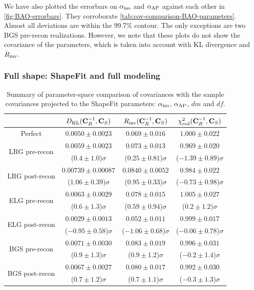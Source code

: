 We have also plotted the errorbars on ${\alpha_{\rm iso}}$ and ${\alpha_{\rm AP}}$ against each other in \cref{fig:BAO-errorbars}.
They corroborate \cref{tab:cov-comparison-BAO-parameters}.
Almost all deviations are within the 99.7\% contour.
The only exceptions are two BGS pre-recon realizations.
However, we note that these plots do not show the covariance of the parameters, which is taken into account with KL divergence and $R_{\rm inv}$.

\subsubsection{Full shape: ShapeFit and full modeling}
\label{sec:cov-comparison-fullshape-param}

\begin{table}[tb]
\centering
\begin{tabular}{|c|c|c|c|}
\hline
 & $D_{\rm KL} ({\bf C}_R^{-1}, {\bf C}_S)$ & $R_{\rm inv} ({\bf C}_R^{-1}, {\bf C}_S)$ & $\chi^2_{\rm red} ({\bf C}_R^{-1}, {\bf C}_S)$ \\
\hline
Perfect & $0.0050 \pm 0.0023$ & $0.069 \pm 0.016$ & $1.000 \pm 0.022$ \\
\hline
\multirow{2}{*}{LRG pre-recon} & $0.0059 \pm 0.0023$ & $0.073 \pm 0.013$ & $0.969 \pm 0.020$ \\
 & ($0.4 \pm 1.0$)$\sigma$ & ($0.25 \pm 0.81$)$\sigma$ & ($-1.39 \pm 0.89$)$\sigma$ \\
\hline
\multirow{2}{*}{LRG post-recon} & $0.00739 \pm 0.00087$ & $0.0840 \pm 0.0052$ & $0.984 \pm 0.022$ \\
 & ($1.06 \pm 0.39$)$\sigma$ & ($0.95 \pm 0.33$)$\sigma$ & ($-0.73 \pm 0.98$)$\sigma$ \\
\hline
\multirow{2}{*}{ELG pre-recon} & $0.0063 \pm 0.0029$ & $0.078 \pm 0.015$ & $1.005 \pm 0.027$ \\
 & ($0.6 \pm 1.3$)$\sigma$ & ($0.59 \pm 0.94$)$\sigma$ & ($0.2 \pm 1.2$)$\sigma$ \\
\hline
\multirow{2}{*}{ELG post-recon} & $0.0029 \pm 0.0013$ & $0.052 \pm 0.011$ & $0.999 \pm 0.017$ \\
 & ($-0.95 \pm 0.58$)$\sigma$ & ($-1.06 \pm 0.68$)$\sigma$ & ($-0.06 \pm 0.78$)$\sigma$ \\
\hline
\multirow{2}{*}{BGS pre-recon} & $0.0071 \pm 0.0030$ & $0.083 \pm 0.019$ & $0.996 \pm 0.031$ \\
 & ($0.9 \pm 1.3$)$\sigma$ & ($0.9 \pm 1.2$)$\sigma$ & ($-0.2 \pm 1.4$)$\sigma$ \\
\hline
\multirow{2}{*}{BGS post-recon} & $0.0067 \pm 0.0027$ & $0.080 \pm 0.017$ & $0.992 \pm 0.030$ \\
 & ($0.7 \pm 1.2$)$\sigma$ & ($0.7 \pm 1.1$)$\sigma$ & ($-0.3 \pm 1.3$)$\sigma$ \\
\hline
\end{tabular}
\caption[Parameter-space comparison of \rascalc{} covariances with the \desimock{} sample covariances projected to the ShapeFit parameters]{Summary of parameter-space comparison of \rascalc{} covariances with the sample covariances projected to the ShapeFit parameters: ${\alpha_{\rm iso}}$, ${\alpha_{\rm AP}}$, $dm$ and $df$.}
\label{tab:cov-comparison-ShapeFit-parameters}
\end{table}

